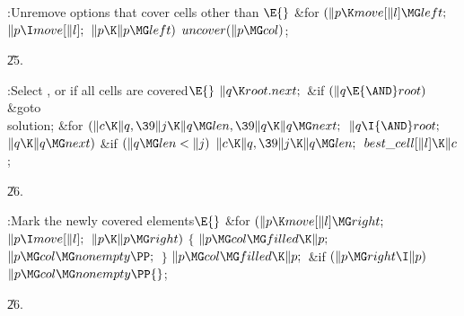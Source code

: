 \B{}:Unremove options that cover cells other than %
\X${}\E{}$\6
\&{for} ${}(\|p\K\\{move}[\|l]\MG\\{left};{}$ ${}\|p\I\\{move}[\|l];{}$ ${}\|p%
\K\|p\MG\\{left}){}$\1\5
${}\\{uncover}(\|p\MG\\{col}){}$;\2\par
\U25.\fi

\B{}:Select , or  if all cells are covered\X${}\E{}$\6
$\|q\K\\{root}.\\{next};{}$\6
\&{if} ${}(\|q\E{\AND}\\{root}){}$\1\5
\&{goto} \\{solution};\2\6
\&{for} ${}(\|c\K\|q,\39\|j\K\|q\MG\\{len},\39\|q\K\|q\MG\\{next};{}$ ${}\|q\I{%
\AND}\\{root};{}$ ${}\|q\K\|q\MG\\{next}){}$\1\6
\&{if} ${}(\|q\MG\\{len}<\|j){}$\1\5
${}\|c\K\|q,\39\|j\K\|q\MG\\{len};{}$\2\2\6
${}\\{best\_cell}[\|l]\K\|c{}$;\par
\U26.\fi

\B{}:Mark the newly covered elements\X${}\E{}$\6
\&{for} ${}(\|p\K\\{move}[\|l]\MG\\{right};{}$ ${}\|p\I\\{move}[\|l];{}$ ${}\|p%
\K\|p\MG\\{right}){}$\5
${}\{{}$\1\6
${}\|p\MG\\{col}\MG\\{filled}\K\|p;{}$\6
${}\|p\MG\\{col}\MG\\{nonempty}\PP;{}$\6
\4${}\}{}$\2\6
${}\|p\MG\\{col}\MG\\{filled}\K\|p;{}$\6
\&{if} ${}(\|p\MG\\{right}\I\|p){}$\1\5
${}\|p\MG\\{col}\MG\\{nonempty}\PP{}$;\2\par
\U26.\fi

